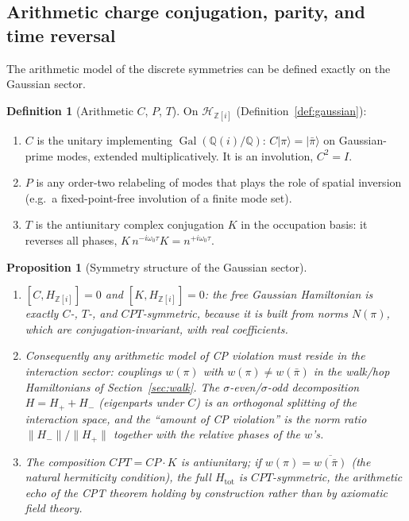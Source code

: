 \documentclass[11pt,a4paper]{article}
\theoremstyle{plain}
\newtheorem{proposition}[theorem]{Proposition}
\theoremstyle{definition}
\newtheorem{definition}[theorem]{Definition}
\theoremstyle{remark}
\newcommand{\ket}[1]{\lvert #1\rangle}
\newcommand{\Zz}{\mathbb{Z}}
\newcommand{\Qq}{\mathbb{Q}}
\newcommand{\Hil}{\mathcal{H}}
\DeclareMathOperator{\Gal}{Gal}
\begin{document}
\subsection{Arithmetic charge conjugation, parity, and time reversal}

The arithmetic model of the discrete symmetries can be defined exactly on the
Gaussian sector.

\begin{definition}[Arithmetic $C$, $P$, $T$]\label{def:cpt}
On $\Hil_{\Zz[i]}$ (Definition~\ref{def:gaussian}):
\begin{enumerate}[leftmargin=1.6em]
\item $C$ is the unitary implementing $\Gal(\Qq(i)/\Qq)$: $C\ket{\pi}=\ket{\bar\pi}$ on
Gaussian-prime modes, extended multiplicatively. It is an involution,
$C^{2}=I$.
\item $P$ is any order-two relabeling of modes that plays the role of spatial inversion
(e.g.\ a fixed-point-free involution of a finite mode set).
\item $T$ is the antiunitary complex conjugation $K$ in the occupation basis: it reverses
all phases, $K\,n^{-i\omega_{0}\tau}K=n^{+i\omega_{0}\tau}$.
\end{enumerate}
\end{definition}

\begin{proposition}[Symmetry structure of the Gaussian sector]\label{prop:cpt}
\begin{enumerate}[leftmargin=1.6em]
\item $[C,H_{\Zz[i]}]=0$ and $[K,H_{\Zz[i]}]=0$: the \emph{free} Gaussian Hamiltonian is
exactly $C$-, $T$-, and $CPT$-symmetric, because it is built from norms $N(\pi)$, which are
conjugation-invariant, with real coefficients.
\item Consequently any arithmetic model of CP violation must reside in the
\emph{interaction} sector: couplings $w(\pi)$ with
$w(\pi)\neq w(\bar\pi)$ in the walk/hop Hamiltonians of Section~\ref{sec:walk}. The
$\sigma$-even/$\sigma$-odd decomposition
$H=H_{+}+H_{-}$ (eigenparts under $C$) is an orthogonal splitting of the interaction space,
and the ``amount of CP violation'' is the norm ratio $\|H_{-}\|/\|H_{+}\|$ together with the
relative phases of the $w$'s.
\item The composition $CPT=CP\cdot K$ is antiunitary; if $w(\pi)=\overline{w(\bar\pi)}$
(the natural hermiticity condition), the full $H_{\mathrm{tot}}$ is $CPT$-symmetric,
the arithmetic echo of the CPT theorem holding by construction rather than by axiomatic
field theory.
\end{enumerate}
\end{proposition}
\end{document}
